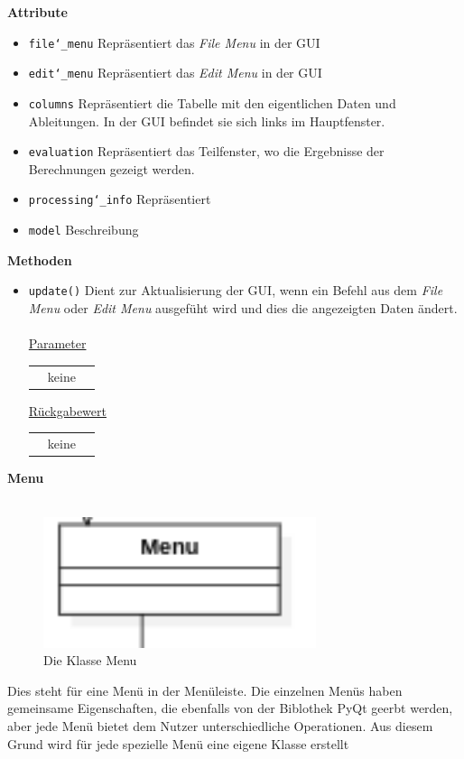 \documentclass{article}
\begin{document}
\textbf{{Attribute}}
\begin{itemize}
\item \texttt{file\char`_menu} \newline Repräsentiert das \textit{File Menu} in der GUI
\item \texttt{edit\char`_menu} \newline Repräsentiert das \textit{Edit Menu} in der GUI
\item \texttt{columns} \newline Repräsentiert die Tabelle mit den eigentlichen Daten und Ableitungen. In der GUI befindet sie sich links im Hauptfenster.
\item \texttt{evaluation} \newline Repräsentiert das Teilfenster, wo die Ergebnisse der Berechnungen gezeigt werden.
\item \texttt{processing\char`_info} \newline Repräsentiert 
\item \texttt{model} \newline Beschreibung
\end{itemize}

\textbf{{Methoden}}
\begin{itemize}
\item \texttt{update()} \newline Dient zur Aktualisierung der GUI, wenn ein Befehl aus dem \textit{File Menu} oder \textit{Edit Menu} ausgefüht wird und dies die angezeigten Daten ändert.
\\\\
\underline{{Parameter}}
\begin{tabular}{lll}
 & keine \\
\end{tabular}

\underline{{Rückgabewert}}
\begin{tabular}{lll}
 & keine \\
\end{tabular}
\end{itemize}

\newpage
\textbf{\large{Menu}}\\\\
\begin{figure}[H]%
    \centering
    \centering
    \includegraphics[width=8cm]{entwurf/Entwurf_dokument/img/Alissa/Menu.png}
    \caption{Die Klasse Menu}
\end{figure}
Dies steht für eine Menü in der Menüleiste. Die einzelnen Menüs haben gemeinsame Eigenschaften, die ebenfalls von der Biblothek PyQt geerbt werden, aber jede Menü bietet dem Nutzer unterschiedliche Operationen. Aus diesem Grund wird für jede spezielle Menü eine eigene Klasse erstellt
\newpage
\end{document}
